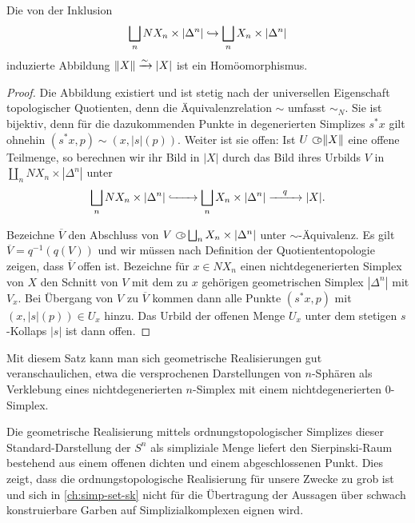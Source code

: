 \begin{satz}
  Die von der Inklusion
  \[ \coprod_n NX_n \times |\Delta^n| \inj \coprod_n X_n \times |\Delta^n| \]
  induzierte Abbildung $\|X\| \iso |X|$ ist ein Homöomorphismus.
\end{satz}
\begin{proof}
  Die Abbildung existiert und ist stetig nach der universellen
  Eigenschaft topologischer Quotienten, denn die Äquivalenzrelation
  $\sim$ umfasst $\sim_N$. Sie ist bijektiv, denn für die
  dazukommenden Punkte in degenerierten Simplizes $s^* x$ gilt ohnehin
  $(s^* x, p) \sim (x, |s|(p))$. Weiter ist sie offen: Ist $U \open
  \|X\|$ eine offene Teilmenge, so berechnen wir ihr Bild in $|X|$
  durch das Bild ihres Urbilds $V$ in $\coprod_n NX_n \times
  |\Delta^n|$ unter
  \[ \coprod_n NX_n \times |\Delta^n|
  \xhookrightarrow{\qquad} \coprod_n X_n \times |\Delta^n|
  \xrightarrow{\quad q \quad} |X|. \]

  Bezeichne $\overline{V}$ den Abschluss von $V \open \coprod_n X_n
  \times |\Delta^n|$ unter $\sim$-Äquivalenz. Es gilt $\overline{V} =
  q^{-1}(q(V))$ und wir müssen nach Definition der Quotiententopologie
  zeigen, dass $\overline{V}$ offen ist. Bezeichne für $x \in NX_n$
  einen nichtdegenerierten Simplex von $X$ den Schnitt von $V$ mit dem
  zu $x$ gehörigen geometrischen Simplex $|\Delta^n|$ mit $V_x$. Bei
  Übergang von $V$ zu $\overline{V}$ kommen dann alle Punkte $(s^* x,
  p)$ mit $(x, |s|(p)) \in U_x$ hinzu. Das Urbild der offenen Menge
  $U_x$ unter dem stetigen $s$-Kollaps $|s|$ ist dann offen.
\end{proof}
\begin{bem} \label{real-sphere}
  Mit diesem Satz kann man sich geometrische Realisierungen gut
  veranschaulichen, etwa die versprochenen Darstellungen von
  $n$-Sphären als Verklebung eines nichtdegenerierten $n$-Simplex mit
  einem nichtdegenerierten $0$-Simplex.
\end{bem}
\begin{bsp} \label{ex:clumsy-sphere}
  Die geometrische Realisierung mittels ordnungstopologischer
  Simplizes dieser Standard-Darstellung der $S^n$ als simpliziale
  Menge liefert den Sierpinski-Raum bestehend aus einem offenen
  dichten und einem abgeschlossenen Punkt. Dies zeigt, dass die
  ordnungstopologische Realisierung für unsere Zwecke zu grob ist und
  sich in \autoref{ch:simp-set-sk} nicht für die Übertragung der
  Aussagen über schwach konstruierbare Garben auf Simplizialkomplexen
  eignen wird.
\end{bsp}

